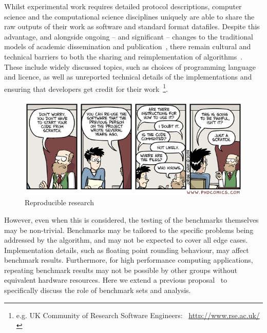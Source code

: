 \documentclass[conference]{IEEEtran}
\begin{document}
Whilst experimental work requires detailed protocol descriptions,
computer science and the computational science disciplines uniquely
are able to share the raw outputs of their work as software and
standard format datafiles. Despite this advantage, and alongside
ongoing -- and significant -- changes to the traditional models of
academic dissemination and
publication~\cite{deroure:2010,stodden-et-al:2013,fursin+dubach:2014},
there remain cultural and technical barriers to both the sharing and
reimplementation of algorithms~\cite{crick-et-al_wssspe2}. These
include widely discussed topics, such as choices of programming
language and licence, as well as unreported technical details of the
implementations and ensuring that developers get credit for their
work~\footnote{e.g. UK Community of Research Software Engineers:
  ~\url{http://www.rse.ac.uk/}}.


\begin{figure}[!ht]
\centering
\includegraphics[width=\columnwidth]{phd031214s.png}
\caption{Reproducible research\newline [source: \url{http://www.phdcomics.com/comics.php?f=1689}]}
\label{fig:reprodres} 
\end{figure}

However, even when this is considered, the testing of the benchmarks
themselves may be non-trivial. Benchmarks may be tailored to the
specific problems being addressed by the algorithm, and may not be
expected to cover all edge cases. Implementation details, such as
floating point rounding behaviour, may affect benchmark results.
Furthermore, for high performance computing applications, repeating
benchmark results may not be possible by other groups without
equivalent hardware resources. Here we extend a previous
proposal~\cite{crick-et-al_wssspe2} to specifically discuss the role
of benchmark sets and analysis.
\end{document}
